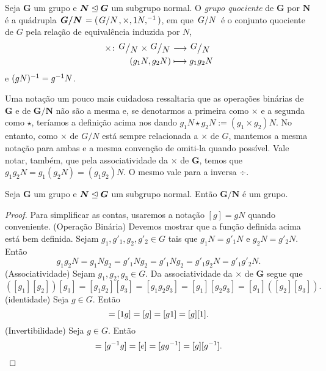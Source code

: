 \begin{definition}
Seja $\bm G$ um grupo e $\bm N \mathrel{\unlhd} \bm G$ um subgrupo normal. O \emph{grupo quociente} de $\bm G$ por $\bm N$ é a quádrupla $\bm{\quo{G}{N}}=(\quo{G}{N},\times,1 N,\inv)$, em que $\quo{G}{N}$ é o conjunto quociente de $G$ pela relação de equivalência induzida por $N$,
	\begin{align*}
	\func{\times}{\quo{G}{N} \times \quo{G}{N}}{\quo{G}{N}}{(g_1N,g_2N)}{g_1g_2N}
	\end{align*}
e $(gN)^{-1}=g^{-1} N$.
\end{definition}

Uma notação um pouco mais cuidadosa ressaltaria que as operações binárias de $\bm G$ e de $\bm{G/N}$ não são a mesma e, se denotarmos a primeira como $\times$ e a segunda como $\star$, teríamos a definição acima nos dando $g_1N \star g_2N := (g_1 \times g_2)N$. No entanto, como $\times$ de $G/N$ está sempre relacionada a $\times$ de $G$, mantemos a mesma notação para ambas e a mesma convenção de omiti-la quando possível. Vale notar, também, que pela associatividade da $\times$ de $\bm G$, temos que $g_1g_2N=g_1(g_2N)=(g_1g_2)N$. O mesmo vale para a inversa $\div$.

\begin{proposition}
Seja $\bm G$ um grupo e $\bm N \mathrel{\unlhd} \bm G$ um subgrupo normal. Então $\bm{G/N}$ é um grupo.
\end{proposition}
\begin{proof}
Para simplificar as contas, usaremos a notação $[g]=gN$ quando conveniente.
(Operação Binária) Devemos mostrar que a função definida acima está bem definida. Sejam $g_1,g'_1,g_2,g'_2 \in G$ tais que $g_1N=g'_1N$ e $g_2N=g'_2N$. Então
	\begin{equation*}
	g_1g_2N = g_1Ng_2 = g'_1Ng_2 = g'_1Ng_2 = g'_1g_2N=g'_1g'_2N.
	\end{equation*}
(Associatividade) Sejam $g_1,g_2,g_3 \in G$. Da associatividade da $\times$ de $\bm G$ segue que
	\begin{equation*}
	([g_1][g_2])[g_3] = [g_1g_2][g_3] = [g_1g_2g_3] = [g_1][g_2g_3] = [g_1]([g_2] [g_3]).
	\end{equation*}
(identidade) Seja $g \in G$. Então
	\begin{equation*}
	[1][g] = [1 g] = [g] = [g\id] = [g][1].
	\end{equation*}
(Invertibilidade) Seja $g \in G$. Então
	\begin{equation*}
	[g\inv][g] = [g\inv g] = [e] = [gg\inv] = [g][g\inv].
	\end{equation*}
\end{proof}

